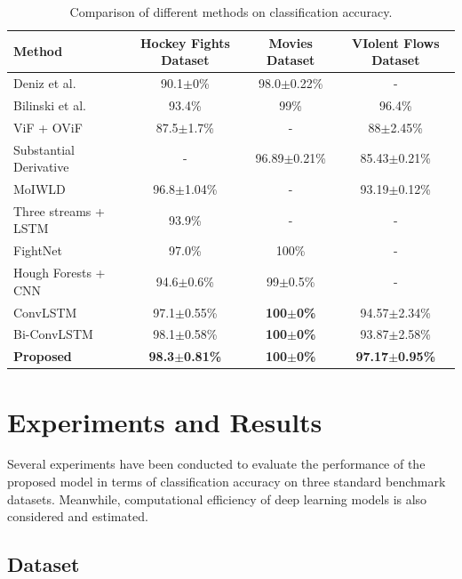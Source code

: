 \documentclass[10pt,twocolumn,letterpaper]{article}
\begin{document}
\begin{table}
\begin{center}
\caption{Comparison of different methods on classification accuracy.}
\label{table:result}
\begin{tabular}{lccc}
\hline
\textbf{Method} & \textbf{Hockey Fights Dataset} & \textbf{Movies Dataset} & \textbf{VIolent Flows Dataset} \\
\hline\hline
Deniz et al. \cite{fast} & 90.1$\pm$0\% & 98.0$\pm$0.22\% & - \\
Bilinski et al. \cite{bilinski2016human} & 93.4\% & 99\% & 96.4\% \\
ViF + OViF \cite{ovif} & 87.5$\pm$1.7\% & - & 88$\pm$2.45\% \\
Substantial Derivative \cite{moha_avss} & - & 96.89$\pm$0.21\% & 85.43$\pm$0.21\% \\
MoIWLD \cite{MoIWLD} & 96.8$\pm$1.04\% & - & 93.19$\pm$0.12\% \\
\hline
Three streams + LSTM \cite{dong2016multi} & 93.9\% & - & - \\
FightNet \cite{zhou2017violent} & 97.0\% & 100\% & - \\
Hough Forests + CNN \cite{serrano2018fight} & 94.6$\pm$0.6\% & 99$\pm$0.5\% & - \\
ConvLSTM \cite{convlstm_sudh} & 97.1$\pm$0.55\% & \textbf{100$\pm$0\%} & 94.57$\pm$2.34\% \\
Bi-ConvLSTM \cite{bi_convlstm} & 98.1$\pm$0.58\% & \textbf{100$\pm$0\%} & 93.87$\pm$2.58\% \\
\textbf{Proposed} & \textbf{98.3$\pm$0.81\%} & \textbf{100$\pm$0\%} & \textbf{97.17$\pm$0.95\%} \\
\hline
\end{tabular}
\end{center}
\end{table}


\section{Experiments and Results}

Several experiments have been conducted to evaluate the performance of the proposed model in terms of classification accuracy on three standard benchmark datasets. Meanwhile, computational efficiency of deep learning models is also considered and estimated.

\subsection{Dataset}
\end{document}

